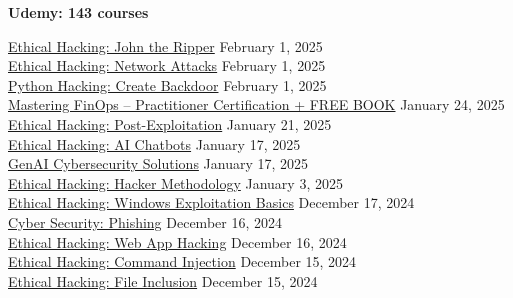 \documentclass[10pt]{res} %
\begin{document}
\begin{resume}
\colorbox{udemy}{\color{white}\centerline{\bf Udemy: 143 courses}}

\href{https://www.udemy.com/certificate/UC-e79440d6-d387-4097-8252-f7fc1113b667}{\color{blue}Ethical Hacking: John the Ripper} \hfill February 1, 2025 \\
\href{https://www.udemy.com/certificate/UC-5e208dd8-1c1e-4071-ba3b-e12828ce2561}{\color{blue}Ethical Hacking: Network Attacks} \hfill February 1, 2025 \\
\href{https://www.udemy.com/certificate/UC-0398bdfe-20f2-4b24-b60a-2a7877b9cce0}{\color{blue}Python Hacking: Create Backdoor} \hfill February 1, 2025 \\
\href{https://www.udemy.com/certificate/UC-0fb7de51-4221-4545-a8ee-4bc4ff2608bb}{\color{blue}Mastering FinOps -- Practitioner Certification + FREE BOOK} \hfill January 24, 2025 \\
\href{https://www.udemy.com/certificate/UC-8a0b59fe-88b8-416e-bb29-93fe283c10a7}{\color{blue}Ethical Hacking: Post-Exploitation} \hfill January 21, 2025 \\
\href{https://www.udemy.com/certificate/UC-bd9bef72-2f8f-4dee-b2e1-d8cd87f9ce7f}{\color{blue}Ethical Hacking: AI Chatbots} \hfill January 17, 2025 \\
\href{https://www.udemy.com/certificate/UC-d9fae6a3-724a-4b21-987e-bf3183762aa4}{\color{blue}GenAI Cybersecurity Solutions} \hfill January 17, 2025 \\
\href{https://www.udemy.com/certificate/UC-40579dba-c92f-4cfb-bf90-1a6d970344a4}{\color{blue}Ethical Hacking: Hacker Methodology} \hfill January 3, 2025 \\
\href{https://www.udemy.com/certificate/UC-74c40416-79c5-4497-a93d-92d2482bd938}{\color{blue}Ethical Hacking: Windows Exploitation Basics} \hfill December 17, 2024 \\
\href{https://www.udemy.com/certificate/UC-098deec5-9a2f-48fc-b90f-724452050393}{\color{blue}Cyber Security: Phishing} \hfill December 16, 2024 \\
\href{https://www.udemy.com/certificate/UC-fa8b5431-a0e5-407b-9464-3d96cad7e9de}{\color{blue}Ethical Hacking: Web App Hacking} \hfill December 16, 2024 \\
\href{https://www.udemy.com/certificate/UC-cbaa016d-c37d-4984-baa4-01c305deed42}{\color{blue}Ethical Hacking: Command Injection} \hfill December 15, 2024 \\
\href{https://www.udemy.com/certificate/UC-9988f2d7-cc26-4190-93b6-0ac55fee1d39}{\color{blue}Ethical Hacking: File Inclusion} \hfill December 15, 2024 \\

\end{resume}
\end{document}
